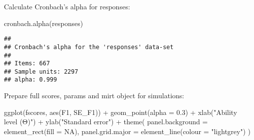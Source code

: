 \documentclass[
]{article}
\newenvironment{Shaded}{\begin{snugshade}}{\end{snugshade}}
\newcommand{\AttributeTok}[1]{\textcolor[rgb]{0.77,0.63,0.00}{#1}}
\newcommand{\CommentTok}[1]{\textcolor[rgb]{0.56,0.35,0.01}{\textit{#1}}}
\newcommand{\ConstantTok}[1]{\textcolor[rgb]{0.00,0.00,0.00}{#1}}
\newcommand{\DecValTok}[1]{\textcolor[rgb]{0.00,0.00,0.81}{#1}}
\newcommand{\FloatTok}[1]{\textcolor[rgb]{0.00,0.00,0.81}{#1}}
\newcommand{\FunctionTok}[1]{\textcolor[rgb]{0.00,0.00,0.00}{#1}}
\newcommand{\NormalTok}[1]{#1}
\newcommand{\OtherTok}[1]{\textcolor[rgb]{0.56,0.35,0.01}{#1}}
\newcommand{\SpecialCharTok}[1]{\textcolor[rgb]{0.00,0.00,0.00}{#1}}
\newcommand{\StringTok}[1]{\textcolor[rgb]{0.31,0.60,0.02}{#1}}
\begin{document}
Calculate Cronbach's alpha for responses:

\begin{Shaded}
\begin{Highlighting}[]
\FunctionTok{cronbach.alpha}\NormalTok{(responses)}
\end{Highlighting}
\end{Shaded}

\begin{verbatim}
## 
## Cronbach's alpha for the 'responses' data-set
## 
## Items: 667
## Sample units: 2297
## alpha: 0.999
\end{verbatim}

Prepare full scores, params and mirt object for simulations:

\begin{Shaded}
\end{Shaded}

\begin{Shaded}
\begin{Highlighting}[]
\FunctionTok{ggplot}\NormalTok{(fscores, }\FunctionTok{aes}\NormalTok{(F1, SE\_F1)) }\SpecialCharTok{+}
  \FunctionTok{geom\_point}\NormalTok{(}\AttributeTok{alpha =} \FloatTok{0.3}\NormalTok{) }\SpecialCharTok{+}
  \FunctionTok{xlab}\NormalTok{(}\StringTok{"Ability level (Θ)"}\NormalTok{) }\SpecialCharTok{+}
  \FunctionTok{ylab}\NormalTok{(}\StringTok{"Standard error"}\NormalTok{) }\SpecialCharTok{+}
  \FunctionTok{theme}\NormalTok{(}
  \AttributeTok{panel.background =} \FunctionTok{element\_rect}\NormalTok{(}\AttributeTok{fill =} \ConstantTok{NA}\NormalTok{),}
  \AttributeTok{panel.grid.major =} \FunctionTok{element\_line}\NormalTok{(}\AttributeTok{colour =} \StringTok{"lightgrey"}\NormalTok{)}
\NormalTok{)}
\end{Highlighting}
\end{Shaded}
\end{document}
